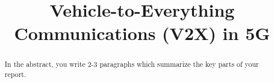 \documentclass[conference,12pt,onecolumn]{IEEEtran}
\begin{document}
%
\title{Vehicle-to-Everything Communications (V2X) in 5G}


\author{
}


\maketitle

\begin{abstract}
In the abstract, you write 2-3 paragraphs which summarize the key parts of your report.
\end{abstract}


\IEEEpeerreviewmaketitle
\end{document}
